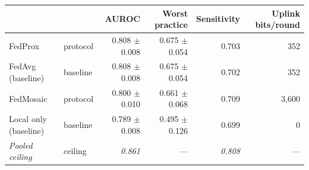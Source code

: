 \setlength{\tabcolsep}{5pt}\small
\begin{tabular}{llrrrr}
    \toprule
    & & AUROC & Worst practice & Sensitivity & Uplink bits/round \\
    \midrule
    FedProx & protocol & 0.808 $\pm$ 0.008 & 0.675 $\pm$ 0.054 & 0.703 & 352 \\
    FedAvg (baseline) & baseline & 0.808 $\pm$ 0.008 & 0.675 $\pm$ 0.054 & 0.702 & 352 \\
    FedMosaic & protocol & 0.800 $\pm$ 0.010 & 0.661 $\pm$ 0.068 & 0.709 & 3,600 \\
    Local only (baseline) & baseline & 0.789 $\pm$ 0.008 & 0.495 $\pm$ 0.126 & 0.699 & 0 \\
    \midrule
    \emph{Pooled ceiling} & ceiling & \emph{0.861} & --- & \emph{0.808} & --- \\
    \bottomrule
\end{tabular}
